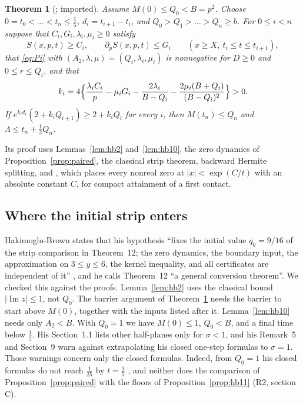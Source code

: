 \documentclass[11pt]{article}
\newtheorem{theorem}{Theorem}[section]
\theoremstyle{definition}
\theoremstyle{remark}
\newcommand{\im}{\operatorname{Im}}
\numberwithin{equation}{section}
\begin{document}
\begin{theorem}[{\cite[Theorem~12]{hb}}; imported]\label{thm:hb12}
Assume $M(0)\le Q_0<B=p^2$. Choose $0=t_0<\dots<t_n\le\frac15$,
$d_i=t_{i+1}-t_i$, and $Q_0>Q_1>\dots>Q_n\ge b$. For $0\le i<n$ suppose
that $C_i,G_i,\lambda_i,\mu_i\ge0$ satisfy
\[
S(x,p,t)\ge C_i,\qquad\partial_pS(x,p,t)\le G_i\qquad(x\ge X,\ t_i\le t\le t_{i+1}),
\]
that \eqref{eq:Pi} with $(A_2,\lambda,\mu)=(Q_i,\lambda_i,\mu_i)$ is
nonnegative for $D\ge0$ and $0\le r\le Q_i$, and that
\[
k_i=4\Bigl\{\frac{\lambda_iC_i}p-\mu_iG_i-\frac{2\lambda_i}{B-Q_i}-\frac{2\mu_i(B+Q_i)}{(B-Q_i)^2}\Bigr\}>0 .
\]
If $e^{k_id_i}(2+k_iQ_{i+1})\ge2+k_iQ_i$ for every $i$, then
$M(t_n)\le Q_n$ and $\Lambda\le t_n+\frac12Q_n$.
\end{theorem}

Its proof uses Lemmas~\ref{lem:hb2} and~\ref{lem:hb10}, the zero dynamics
of Proposition~\ref{prop:paired}, the classical strip theorem, backward
Hermite splitting, and \cite[Theorem~1.5(i)]{polymath}, which places
every nonreal zero at $\lvert x\rvert<\exp(C/t)$ with an absolute constant
$C$, for compact attainment of a first contact.

\subsection{Where the initial strip enters}\label{sec:q0}

Hakimoglu-Brown states that his hypothesis ``fixes the initial value
$q_0=9/16$ of the strip comparison in Theorem~12; the zero dynamics, the
boundary input, the approximation on $3\le y\le6$, the kernel inequality,
and all certificates are independent of it'' \cite[Section~1.1]{hb}, and
he calls Theorem~12 ``a general conversion theorem''. We checked this
against the proofs. Lemma~\ref{lem:hb2} uses the classical bound
$\lvert\im z\rvert\le1$, not $Q_0$. The barrier argument of
Theorem~\ref{thm:hb12} needs the barrier to start above $M(0)$, together
with the inputs listed after it. Lemma~\ref{lem:hb10} needs only
$A_2<B$. With $Q_0=1$ we have $M(0)\le1$, $Q_0<B$, and a final time below
$\frac15$. His Section~1.1 lists other half-planes only for $\sigma<1$, and
his Remark~5 and Section~9 warn against extrapolating his closed one-step
formulas to $\sigma=1$. Those warnings concern only the closed formulas.
Indeed, from $Q_0=1$ his closed formulas do not reach $\frac1{25}$ by
$t=\frac15$ \cite[Remark~5]{hb}, and neither does the comparison of
Proposition~\ref{prop:paired} with the floors of
Proposition~\ref{prop:hb11} (R2, section C).
\end{document}
